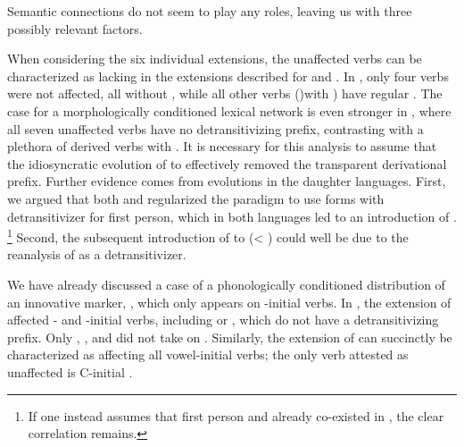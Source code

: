 Semantic connections do not seem to play any roles, leaving us with three possibly relevant factors.

When considering the six individual extensions, the unaffected verbs can be characterized as lacking \detrz in the extensions described for \PWai and \PPek.
In \PWai, only four verbs were not affected, all without \detrz, while all other  verbs ()with \detrz) have regular .
The case for a morphologically conditioned lexical network is even stronger in \PPek, where all seven unaffected verbs have no detransitivizing prefix, contrasting with a plethora of derived  verbs with .
It is necessary for this analysis to assume that the idiosyncratic evolution of   to  effectively removed the transparent derivational prefix.
Further evidence comes from evolutions in the daughter languages.
First, we argued that both \ikpeng and \bakairi regularized the paradigm to use forms with detransitivizer for first person, which in both languages led to an introduction of .%
\footnote{If one instead assumes that first person  and  already co-existed in \PPek, the clear correlation remains.}
Second, the subsequent introduction of  to \ikpeng {}  (< ) could well be due to the reanalysis of  as a detransitivizer.

We have already discussed a case of a phonologically conditioned distribution of an innovative marker, \akuriyo {} , which only appears on -initial verbs.
In \carijo, the extension of  affected - and -initial verbs, including   or  , which do not have a detransitivizing prefix.
Only  ,  , and   did not take on .
Similarly, the extension of \yukpa {} can succinctly be characterized as affecting all vowel-initial verbs; the only verb attested as unaffected is C-initial  .


